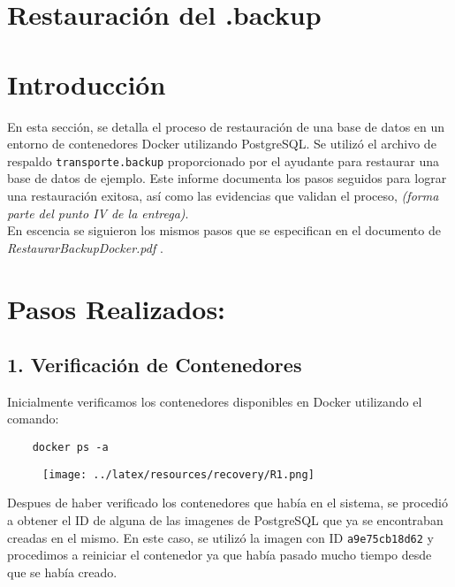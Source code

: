 \section*{\LARGE{Restauración del .backup}}

\section*{Introducción}

En esta sección, se detalla el proceso de restauración de una base de datos en un entorno de contenedores Docker utilizando PostgreSQL. Se utilizó el archivo de respaldo \texttt{transporte.backup} proporcionado por el ayudante para restaurar una base de datos de ejemplo. Este informe documenta los pasos seguidos para lograr una restauración exitosa, así como las evidencias que validan el proceso, \textit{(forma parte del punto IV de la entrega)}. \\

En escencia se siguieron los mismos pasos que se especifican en el documento de \textit{RestaurarBackupDocker.pdf} .

\section*{Pasos Realizados:} 


\subsection*{1. Verificación de Contenedores} 

Inicialmente verificamos los contenedores disponibles en Docker utilizando el comando: \\

\begin{verbatim}
    docker ps -a    
\end{verbatim}


\begin{figure}[h]
    \centering
        \texttt{[image: ../latex/resources/recovery/R1.png]}
    \end{figure}

Despues de haber verificado los contenedores que había en el sistema, se procedió a obtener el ID de alguna de las imagenes de PostgreSQL que ya se encontraban creadas en el mismo. En este caso, se utilizó la imagen con ID \texttt{a9e75cb18d62} y procedimos a reiniciar el contenedor ya que había pasado mucho tiempo desde que se había creado. \\

